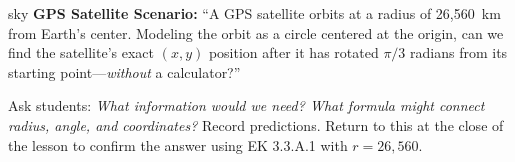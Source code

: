\documentclass[10pt]{article}
\begin{document}
\begin{skillbox}[Hook]{sky}
\textbf{GPS Satellite Scenario:} ``A GPS satellite orbits at a radius of 26{,}560~km from Earth's center. Modeling the orbit as a circle centered at the origin, can we find the satellite's exact $(x, y)$ position after it has rotated $\pi/3$ radians from its starting point---\emph{without} a calculator?''

\smallskip
Ask students: \emph{What information would we need? What formula might connect radius, angle, and coordinates?} Record predictions. Return to this at the close of the lesson to confirm the answer using EK 3.3.A.1 with $r = 26{,}560$.
\end{skillbox}
\vspace{6pt}
\end{document}
